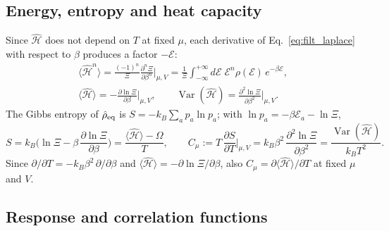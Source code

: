 \documentclass[10pt,a4paper]{article}
\theoremstyle{plain}
\newcommand{\Var}{\operatorname{Var}}
\newcommand{\evalat}{\bigg\vert}  %
\newcommand{\enrg}{\mathcal{E}}  %
\begin{document}
\subsection{Energy, entropy and heat capacity}
\label{sec:filt_mb}

Since $\hat{\mathcal H}$ does not depend on $T$ at fixed $\mu$, each
derivative of Eq.~\eqref{eq:filt_laplace} with respect to $\beta$ produces a
factor $-\enrg$:
\begin{equation}\label{eq:filt_moments}
\begin{gathered}
  \langle\hat{\mathcal H}^{n}\rangle
  = \frac{(-1)^{n}}{\Xi}\frac{\partial^{n}\Xi}{\partial\beta^{n}}\evalat_{\mu, V}
  = \frac{1}{\Xi}\int_{-\infty}^{+\infty} d\enrg\;\enrg^{n}\rho(\enrg)\,e^{-\beta\enrg} ,
  \\
  \langle\hat{\mathcal H}\rangle = -\frac{\partial\ln\Xi}{\partial\beta}\evalat_{\mu, V} ,
  \qquad
  \Var(\hat{\mathcal H}) = \frac{\partial^{2}\ln\Xi}{\partial\beta^{2}}\evalat_{\mu, V} .
\end{gathered}
\end{equation}
The Gibbs entropy of $\hat\rho_{\rm eq}$ is $S=-k_B\sum_ap_a\ln p_a$; with
$\ln p_a=-\beta\enrg_a-\ln\Xi$,
\begin{equation}\label{eq:filt_mb}
  S = k_B\Big(\ln\Xi - \beta\,\frac{\partial\ln\Xi}{\partial\beta}\Big)
  = \frac{\langle\hat{\mathcal{H}}\rangle - \Omega}{T} , \qquad
  C_\mu := T\,\frac{\partial S}{\partial T}\bigg|_{\mu, V}
  = k_B\beta^{2}\,\frac{\partial^{2}\ln\Xi}{\partial\beta^{2}}
  = \frac{\Var(\hat{\mathcal{H}})}{k_BT^{2}} .
\end{equation}
Since $\partial/\partial T=-k_B\beta^{2}\,\partial/\partial\beta$ and
$\langle\hat{\mathcal H}\rangle=-\partial\ln\Xi/\partial\beta$, also
$C_\mu=\partial\langle\hat{\mathcal H}\rangle/\partial T$ at fixed $\mu$ and
$V$.

\subsection{Response and correlation functions}
\label{sec:filt_corr}\label{sec:filt_resp}
\end{document}
